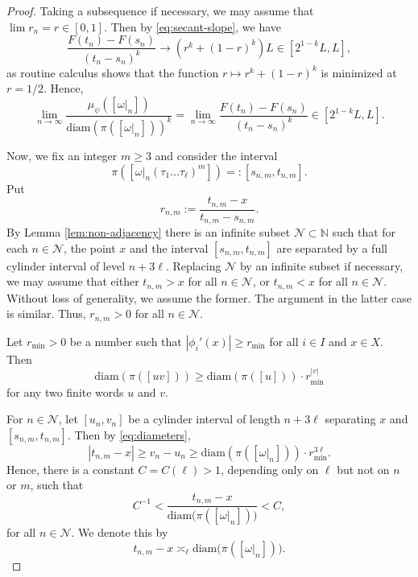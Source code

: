 \documentclass[11pt]{amsart}
\newcommand\NN{\mathbb{N}}
\newcommand\diam{\mathrm{diam}}
\newcommand{\1}{1}
\begin{document}
\begin{proof}
Taking a subsequence if necessary, we may assume that $\lim r_{n}=r\in[0,1]$.
Then by \eqref{eq:secant-slope}, we have
\[
\frac{F(t_{n})-F(s_{n})}{(t_{n}-s_{n})^{k}}\rightarrow\left(r^{k}+(1-r)^{k}\right)L\in\left[2^{1-k}L,L\right],
\]
as routine calculus shows that the function $r\mapsto r^k+(1-r)^k$ is minimized at $r=1/2$.
Hence,
\begin{equation} \label{eq:bounded-ratio}
\lim_{n\rightarrow\infty}\frac{\mu_\psi\left(\left[\omega|_{n}\right]\right)}{\diam\left(\pi\left(\left[\omega|_{n}\right]\right)\right)^{k}}=\lim_{n\rightarrow\infty}\frac{F(t_{n})-F(s_{n})}{(t_{n}-s_{n})^{k}}\in\left[2^{1-k}L,L\right]. %
\end{equation}

Now, we fix an integer {$m\geq 3$} and consider the interval
\[
\pi\left(\left[\omega|_{n}(\tau_{1}\dots \tau_{\ell})^{m}\right]\right)=:\left[s_{n,m},t_{n,m}\right].
\]
Put
\[
r_{n,m}:=\frac{t_{n,m}-x}{t_{n,m}-s_{n,m}}.
\]
By Lemma \ref{lem:non-adjacency} there is an infinite subset $\mathcal{N}\subset\NN$ such that for each $n\in\mathcal{N}$, the point $x$ and the interval $[s_{n,m},t_{n,m}]$ are separated by a full cylinder interval of level $n+3\ell$. 
Replacing $\mathcal{N}$ by an infinite subset if necessary, we may assume that either $t_{n,m}>x$ for all $n\in \mathcal{N}$, or $t_{n,m}<x$ for all $n\in \mathcal{N}$. Without loss of generality, we assume the former. The argument in the latter case is similar. Thus, $r_{n,m}>0$ for all $n\in\mathcal{N}$.

Let $r_{\min}>0$ be a number such that $|\phi_i'(x)|\geq r_{\min}$ for all $i\in I$ and $x\in X$. Then
\begin{equation} \label{eq:diameters}
\diam (\pi([uv]))\geq \diam (\pi([u]))\cdot r_{\min}^{|v|}
\end{equation}
for any two finite words $u$ and $v$.

For $n\in\mathcal{N}$, let $[u_n,v_n]$ be a cylinder interval of length $n+3\ell$ separating $x$ and $[s_{n,m},t_{n,m}]$. Then by \eqref{eq:diameters},
\[
|t_{n,m}-x|\geq v_n-u_n\geq \diam (\pi([\omega|_n]))\cdot r_{\min}^{3\ell}.
\]
Hence, there is a constant $C=C(\ell)>1$, depending only on $\ell$ but not on $n$ or $m$, such that
\[
C^{-1}<\frac{t_{n,m}-x}{\diam\big(\pi\left(\left[\omega|_{n}\right]\right)\big)}<C,
\]
for all $n\in\mathcal{N}$. We denote this by
\begin{equation} \label{eq:comparable}
t_{n,m}-x\asymp_\ell\diam\big(\pi\left(\left[\omega|_{n}\right]\right)\big). 
\end{equation}


\end{proof}
\end{document}
